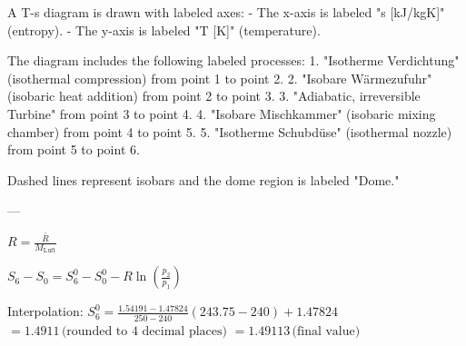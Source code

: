 A T-s diagram is drawn with labeled axes:  
- The x-axis is labeled "s [kJ/kgK]" (entropy).  
- The y-axis is labeled "T [K]" (temperature).  

The diagram includes the following labeled processes:  
1. "Isotherme Verdichtung" (isothermal compression) from point 1 to point 2.  
2. "Isobare Wärmezufuhr" (isobaric heat addition) from point 2 to point 3.  
3. "Adiabatic, irreversible Turbine" from point 3 to point 4.  
4. "Isobare Mischkammer" (isobaric mixing chamber) from point 4 to point 5.  
5. "Isotherme Schubdüse" (isothermal nozzle) from point 5 to point 6.  

Dashed lines represent isobars and the dome region is labeled "Dome."  

---

\( R = \frac{\bar{R}}{M_{\text{Luft}}} \)  

\( S_6 - S_0 = S^0_6 - S^0_0 - R \ln \left( \frac{p_2}{p_1} \right) \)  

Interpolation:  
\( S^0_6 = \frac{1.54191 - 1.47824}{250 - 240} (243.75 - 240) + 1.47824 \)  
\( = 1.4911 \, \text{(rounded to 4 decimal places)} \)  
\( = 1.49113 \, \text{(final value)} \)